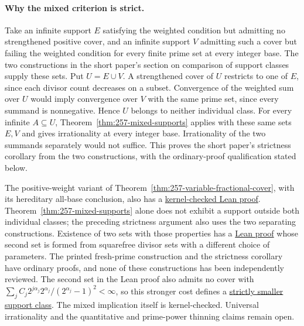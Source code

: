 \documentclass[11pt]{article}
\theoremstyle{plain}
\theoremstyle{definition}
\theoremstyle{remark}
\begin{document}
\paragraph{Why the mixed criterion is strict.}\label{record257:strict-mixed-proof}
Take an infinite support $E$ satisfying the weighted condition but
admitting no strengthened positive cover, and an infinite support $V$
admitting such a cover but failing the weighted condition for every
finite prime set at every integer base.  The two constructions in the short paper's section on comparison of
support classes supply these sets.  Put $U=E\cup V$.  A strengthened cover of $U$ restricts to
one of $E$, since each divisor count decreases on a subset. Convergence
of the weighted sum over $U$ would imply convergence over $V$ with
the same prime set, since every summand is nonnegative.  Hence $U$ belongs to neither individual class.
For every infinite $A\subseteq U$, Theorem~\ref{thm:257-mixed-supports}
applies with these same sets $E,V$ and gives irrationality at every
integer base. Irrationality of the two summands separately would not
suffice. This proves the short paper's strictness corollary from the two
constructions, with the ordinary-proof qualification stated below.

The positive-weight variant of
Theorem~\ref{thm:257-variable-fractional-cover}, with its hereditary
all-base conclusion, also has a
\href{https://github.com/wcook04/plectis-erdos/blob/c91562bd574a387cde904481e609c7b4cacebb14/lean/ErdosProblems/Erdos257/PaperCompleteR8/ArbitraryWeightMixedClaim.lean#L19}{kernel-checked Lean proof}.
Theorem~\ref{thm:257-mixed-supports} alone does not exhibit a support
outside both individual classes; the preceding strictness argument also
uses the two separating constructions. Existence of two sets with those
properties has a
\href{https://github.com/wcook04/plectis-erdos/blob/3973d3b10bce72017b8f60093f0d6c3f4f592d80/lean/ErdosProblems/Erdos257/PaperCompleteR8/AnalyticIncomparability.lean#L53}{Lean proof}
whose second set is formed from squarefree divisor sets with a different
choice of parameters.  The printed fresh-prime construction and the strictness corollary
have ordinary proofs, and none of these constructions has been independently
reviewed.  The second set in the Lean proof also admits no cover with
$\sum_jC_j2^{j\alpha_j}2^{\alpha_j}/(2^{\alpha_j}-1)^2<\infty$, so this
stronger cost defines a
\href{https://github.com/wcook04/plectis-erdos/blob/3973d3b10bce72017b8f60093f0d6c3f4f592d80/lean/ErdosProblems/Erdos257/PaperCompleteR8/AnalyticIncomparability.lean#L41}{strictly smaller support class}.
The mixed implication itself is kernel-checked.
Universal irrationality and the quantitative and prime-power thinning claims
remain open.
\end{document}
